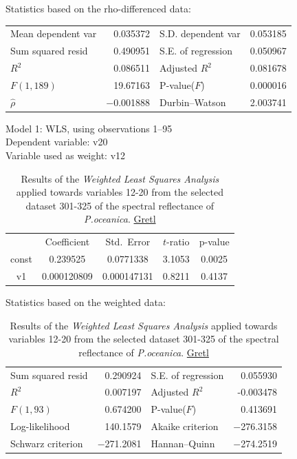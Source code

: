 \documentclass[11pt]{article}
\begin{document}
\begin{appendices}
\begin{table}[H]
\begin{center}
	\vspace{1em}Statistics based on the rho-differenced data:

	\vspace{1ex}
	\begin{tabular}{lrlr}
		Mean dependent var &  0.035372 & S.D. dependent var &  0.053185 \\
		Sum squared resid &  0.490951 & S.E. of regression &  0.050967 \\
		$R^2$ &  0.086511 & Adjusted $R^2$ &  0.081678 \\
		$F(1, 189)$ &  19.67163 & P-value($F$) &  0.000016 \\
		$\hat{\rho}$ & $-$0.001888 & Durbin--Watson &  2.003741 \\
	\end{tabular}
	\end{center}
\end{table}

\begin{table}[H]
	\begin{center}
	\caption{Results of the \textit{Weighted Least Squares Analysis} applied towards variables 12-20 from the selected dataset 301-325 of the spectral reflectance of \textit{P.oceanica}. \href{http://gretl.sourceforge.net/}{Gretl}}
		Model 1: WLS, using observations 1--95\\
		Dependent variable: v20\\
		Variable used as weight: v12

	\vspace{1em}
	\begin{tabular}{|c|c|c|c|c|}
		  & {Coefficient} & {Std.\ Error} & {$t$-ratio} & {p-value} \\[1ex]
		const &   0.239525 &     0.0771338 & 3.1053 &         0.0025 \\
		v1 &   0.000120809 &     0.000147131 &       0.8211 &         0.4137 \\
	\end{tabular}

	\vspace{1em}Statistics based on the weighted data:

	\vspace{1ex}
	\begin{tabular}{lrlr}
		Sum squared resid &  0.290924 & S.E. of regression &  0.055930 \\
		$R^2$ &  0.007197 & Adjusted $R^2$ & -0.003478 \\
		$F(1, 93)$ &  0.674200 & P-value($F$) &  0.413691 \\
		Log-likelihood &  140.1579 & Akaike criterion & $-$276.3158 \\
		Schwarz criterion & $-$271.2081 & Hannan--Quinn & $-$274.2519 \\
	\end{tabular}


\end{center}
\end{table}
\end{appendices}
\end{document}
